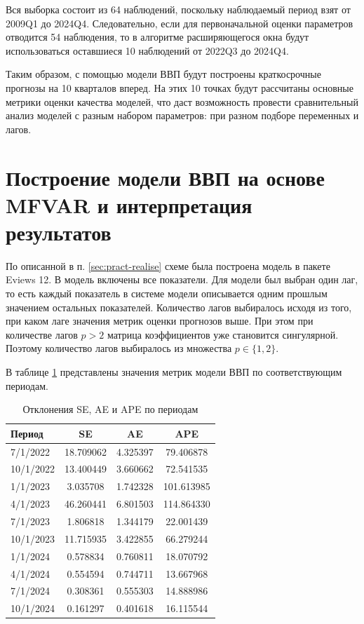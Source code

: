 \documentclass[a4paper, 14pt]{extreport}
\numberwithin{equation}{section}
\numberwithin{equation}{section}
\begin{document}
	Вся выборка состоит из 64 наблюдений, поскольку наблюдаемый период взят от 2009Q1 до 2024Q4. Следовательно, если для первоначальной оценки параметров отводится 54 наблюдения, то в алгоритме расширяющегося окна будут использоваться оставшиеся 10 наблюдений от 2022Q3 до 2024Q4. 
	
	Таким образом, с помощью модели ВВП будут построены краткосрочные прогнозы на 10 кварталов вперед. На этих 10 точках будут рассчитаны основные метрики оценки качества моделей, что даст возможность провести сравнительный анализ моделей с разным набором параметров: при разном подборе переменных и лагов.
	
	\section{Построение модели ВВП на основе MFVAR и интерпретация результатов}
	\label{sec:mfvar-1}
	
	По описанной в п. \ref{sec:pract-realise} схеме была построена модель в пакете Eviews 12. В модель включены все показатели. Для модели был выбран один лаг, то есть каждый показатель в системе модели описывается одним прошлым значением остальных показателей. Количество лагов выбиралось исходя из того, при каком лаге значения метрик оценки прогнозов выше. При этом при количестве лагов $p>2$ матрица коэффициентов уже становится сингулярной. Поэтому количество лагов выбиралось из множества $p \in \{1, 2\}$.
	
	В таблице \ref{tab:metrics-1} представлены значения метрик модели ВВП по соответствующим периодам. 
	\begin{table}[h!]
		\centering
		\caption{Отклонения SE, AE и APE по периодам}
		\begin{tabular}{lccc}
			\toprule
			\textbf{Период} & \textbf{SE} & \textbf{AE} & \textbf{APE} \\ 
			\midrule
			7/1/2022  & 18.709062     & 4.325397     & 79.406878     \\ 
			10/1/2022 & 13.400449     & 3.660662     & 72.541535     \\ 
			1/1/2023  & 3.035708      & 1.742328     & 101.613985    \\ 
			4/1/2023  & 46.260441     & 6.801503     & 114.864330    \\ 
			7/1/2023  & 1.806818      & 1.344179     & 22.001439     \\ 
			10/1/2023 & 11.715935     & 3.422855     & 66.279244     \\ 
			1/1/2024  & 0.578834      & 0.760811     & 18.070792     \\ 
			4/1/2024  & 0.554594      & 0.744711     & 13.667968     \\ 
			7/1/2024  & 0.308361      & 0.555303     & 14.888986     \\ 
			10/1/2024 & 0.161297      & 0.401618     & 16.115544     \\ 
			\bottomrule
		\end{tabular}
		\label{tab:metrics-1}
	\end{table}
	
\end{document}

